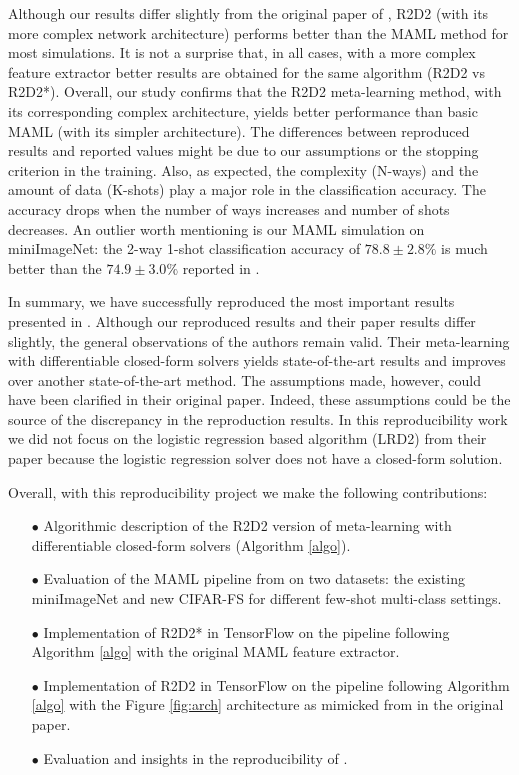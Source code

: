 \hfill \break
Although our results differ slightly from the original paper of \citet{R2D2}, R2D2 (with its more complex network architecture) performs better than the MAML method for most simulations. It is not a surprise that, in all cases, with a more complex feature extractor better results are obtained for the same algorithm (R2D2 vs R2D2*). Overall, our study confirms that the R2D2 meta-learning method, with its corresponding complex architecture, yields better performance than basic MAML (with its simpler architecture). The differences between reproduced results and reported values might be due to our assumptions or the stopping criterion in the training. Also, as expected, the complexity (N-ways) and the amount of data (K-shots) play a major role in the classification accuracy. The accuracy drops when the number of ways increases and number of shots decreases. An outlier worth mentioning is our MAML simulation on miniImageNet: the 2-way 1-shot classification accuracy of $78.8 \pm 2.8\%$ is much better than the $74.9 \pm 3.0\%$ reported in \citet{finn}.

In summary, we have successfully reproduced the most important results presented in \citet{R2D2}. Although our reproduced results and their paper results differ slightly, the general observations of the authors remain valid. Their meta-learning with differentiable closed-form solvers yields state-of-the-art results and improves over another state-of-the-art method. The assumptions made, however, could have been clarified in their original paper. Indeed, these assumptions could be the source of the discrepancy in the reproduction results. In this reproducibility work we did not focus on the logistic regression based algorithm (LRD2) from their paper because the logistic regression solver does not have a closed-form solution.

Overall, with this reproducibility project we make the following contributions:
\begin{itemize}
\item[$\bullet$] Algorithmic description of the R2D2 version of meta-learning with differentiable closed-form solvers (Algorithm \ref{algo}).
\item[$\bullet$] Evaluation of the MAML pipeline from \citet{MAML} on two  datasets: the existing miniImageNet and new \textsc{CIFAR-FS} for different few-shot multi-class settings.
\item[$\bullet$] Implementation of R2D2* in TensorFlow on the pipeline following Algorithm \ref{algo} with the original MAML feature extractor.
\item[$\bullet$] Implementation of R2D2 in TensorFlow on the pipeline following Algorithm \ref{algo} with the Figure \ref{fig:arch} architecture as mimicked from in the original paper\supercite{R2D2}.
\item[$\bullet$] Evaluation and insights in the reproducibility of \citet{R2D2}.
\end{itemize}

